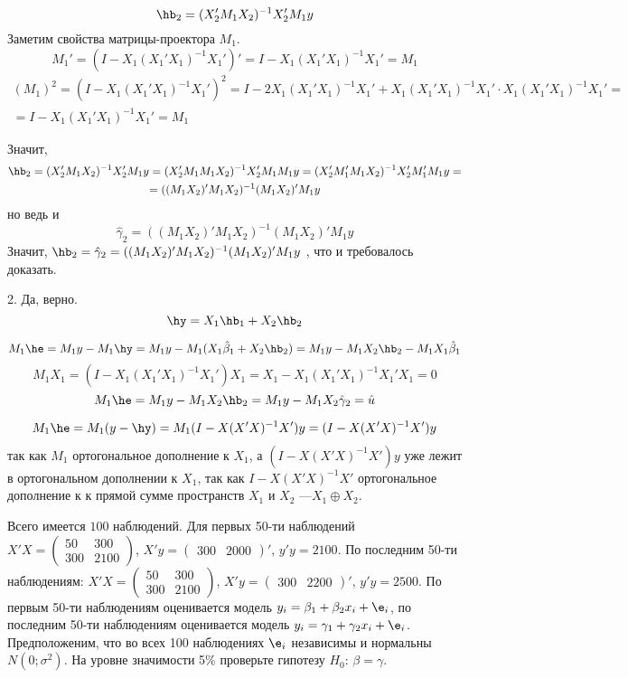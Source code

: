 \documentclass[pdftex,11pt,openany]{book}\usepackage[]{graphicx}\usepackage[]{color}
\begin{document}
\begin{solution}
\[\hb_2=(X_2'M_1X_2)^{-1}X_2'M_1y\]
Заметим свойства матрицы-проектора $M_1$. 
\[M_1'=(I-X_1(X_1'X_1)^{-1}X_1')'=I-X_1(X_1'X_1)^{-1}X_1'=M_1\]
\begin{multline*}
(M_1)^2=(I-X_1(X_1'X_1)^{-1}X_1')^2=I-2X_1(X_1'X_1)^{-1}X_1'+X_1(X_1'X_1)^{-1}X_1'\cdot X_1(X_1'X_1)^{-1}X_1'=\\
=I-X_1(X_1'X_1)^{-1}X_1'=M_1
\end{multline*}

Значит,
\begin{multline*}
\hb_2=(X_2'M_1X_2)^{-1}X_2'M_1y=(X_2'M_1M_1X_2)^{-1}X_2'M_1M_1y=(X_2'M_1'M_1X_2)^{-1}X_2'M_1'M_1y=\\=
((M_1X_2)'M_1X_2)^{-1}(M_1X_2)'M_1y
\end{multline*}
но ведь и
\[
\hat\gamma_2=
((M_1X_2)'M_1X_2)^{-1}(M_1X_2)'M_1y
\]
Значит, $\hb_2=\hat\gamma_2=
((M_1X_2)'M_1X_2)^{-1}(M_1X_2)'M_1y$
, что и требовалось доказать.

2. Да, верно.
\[\hy=X_1\hb_1+X_2\hb_2\]

\[M_1 \he=M_1y-M_1\hy=M_1y-M_1(X_1\hat\beta_1+X_2\hb_2)=M_1y-M_1X_2\hb_2-M_1X_1\hat\beta_1\]
\[M_1X_1=(I-X_1(X_1'X_1)^{-1}X_1')X_1=X_1-X_1(X_1'X_1)^{-1}X_1'X_1=0\]
\[M_1 \he=M_1y-M_1X_2\hb_2=M_1y-M_1X_2\hat\gamma_2=\hat u\]

\begin{multline*}
M_1\he=M_1(y-\hy)=M_1(I-X(X'X)^{-1}X')y=(I-X(X'X)^{-1}X')y
\end{multline*}
так как $M_1$ ортогональное дополнение к $X_1$, а $(I-X(X'X)^{-1}X')y$ уже лежит в ортогональном дополнении к $X_1$, так как $I-X(X'X)^{-1}X'$ ортогональное дополнение к к прямой сумме пространств $X_1$ и $X_2$ ---$X_1\oplus X_2$.\end{solution}



\begin{problem}
Всего имеется $100$ наблюдений. Для первых 50-ти наблюдений $X'X=\begin{pmatrix}
50 & 300 \\
300 & 2100
\end{pmatrix}$, $X'y=\begin{pmatrix}
300 & 2000
\end{pmatrix}'$, $y'y=2100$. По последним 50-ти наблюдениям: $X'X=\begin{pmatrix}
50 & 300 \\
300 & 2100
\end{pmatrix}$, $X'y=\begin{pmatrix}
300 & 2200
\end{pmatrix}'$, $y'y=2500$. По первым 50-ти наблюдениям оценивается модель $y_i = \beta_1 + \beta_2 x_i + \e_i$, по последним 50-ти наблюдениям оценивается модель $y_i = \gamma_1 + \gamma_2 x_i + \e_i$. Предположеним, что во всех 100 наблюдениях $\e_i$ независимы и нормальны $N(0;\sigma^2)$. На уровне значимости 5\% проверьте гипотезу $H_0: \, \beta=\gamma$.
\end{problem}
\begin{solution}
\end{solution}
\end{document}
